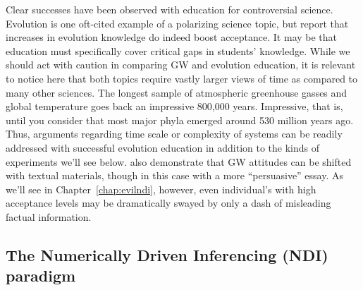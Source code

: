
Clear successes have been observed with education for controversial science.
Evolution is one oft-cited example of a polarizing science topic, but
\textcite{shtulman_learning_2008} report that increases in evolution knowledge
do indeed boost acceptance. It may be that education must specifically
cover critical gaps in students' knowledge. While we should act with caution in
comparing GW and evolution education, it is relevant to notice here that both
topics require
vastly larger views of time as compared to many other sciences. The longest
sample of atmospheric greenhouse gasses and global temperature goes back an
impressive 800,000 years.  Impressive, that is, until you consider that most
major phyla emerged around 530 million years ago. Thus, arguments regarding time
scale or complexity of systems can be readily addressed with successful
evolution education in addition to the kinds of experiments we'll see below.
\textcite{sinatra_promoting_2012} also demonstrate that GW attitudes can be shifted
with textual materials, though in this case with a more “persuasive” essay. As
we'll see in Chapter~\ref{chap:evilndi}, however, even individual's with high
acceptance levels may be dramatically swayed by only a dash of misleading
factual information. 

\subsection{The Numerically Driven Inferencing (NDI) paradigm}
\label{sec:ndi}


